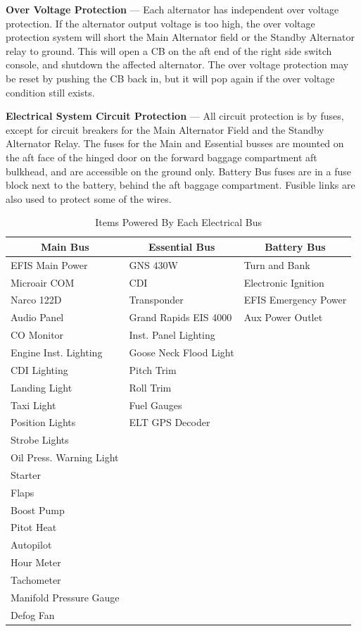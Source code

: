 \textbf{Over Voltage Protection} --- Each alternator has independent over voltage protection. If the alternator output voltage is too high, the over voltage protection system will short the Main Alternator field or the Standby Alternator relay to ground. This will open a CB on the aft end of the right side switch console, and shutdown the affected alternator. The over voltage protection may be reset by pushing the CB back in, but it will pop again if the over voltage condition still exists.

\textbf{Electrical System Circuit Protection} --- All circuit protection is by fuses, except for circuit breakers for the Main Alternator Field and the Standby Alternator Relay. The fuses for the Main and Essential busses are mounted on the aft face of the hinged door on the forward baggage compartment aft bulkhead, and are accessible on the ground only.  Battery Bus fuses are in a fuse block next to the battery, behind the aft baggage compartment. Fusible links are also used to protect some of the wires.

\begin{table}
[htb] 
\begin{center}
\begin{tabular}
{|l|l|l|} \hline \multicolumn{1}{|c|}{Main Bus}& \multicolumn{1}{c|}{Essential Bus} & \multicolumn{1}{c|}{Battery Bus}\tabularnewline \hline \hline EFIS Main Power & GNS 430W & Turn and Bank\tabularnewline \hline Microair COM &CDI & Electronic Ignition\tabularnewline \hline Narco 122D & Transponder & EFIS Emergency Power\tabularnewline \hline Audio Panel &Grand Rapids EIS 4000 & Aux Power Outlet\tabularnewline \hline CO Monitor &Inst. Panel Lighting & \tabularnewline \hline Engine Inst. Lighting &Goose Neck Flood Light & \tabularnewline \hline CDI Lighting &Pitch Trim & \tabularnewline \hline Landing Light &Roll Trim & \tabularnewline \hline Taxi Light &Fuel Gauges & \tabularnewline \hline Position Lights &ELT GPS Decoder & \tabularnewline \hline Strobe Lights & & \tabularnewline \hline Oil Press. Warning Light & & \tabularnewline \hline Starter & & \tabularnewline \hline Flaps & & \tabularnewline \hline Boost Pump & & \tabularnewline \hline Pitot Heat & & \tabularnewline \hline Autopilot & & \tabularnewline \hline Hour Meter & & \tabularnewline \hline Tachometer & & \tabularnewline \hline Manifold Pressure Gauge & & \tabularnewline \hline Defog Fan & & \tabularnewline \hline 
\end{tabular}
\caption{Items Powered By Each Electrical Bus} 
\end{center}
\end{table}

